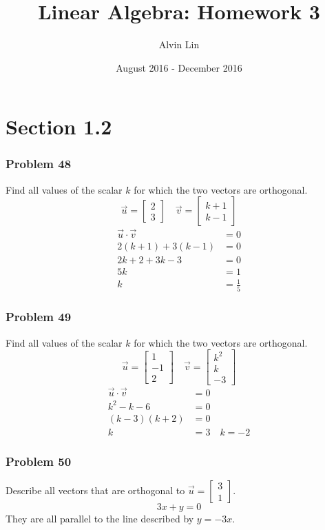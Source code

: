 \documentclass[letterpaper, 12pt]{math}
\title{Linear Algebra: Homework 3}
\author{Alvin Lin}
\date{August 2016 - December 2016}
\begin{document}
\maketitle

\section*{Section 1.2}

\subsubsection*{Problem 48}
Find all values of the scalar \( k \) for which the two vectors are orthogonal.
\[ \vec{u} = \begin{bmatrix}2 \\ 3\end{bmatrix} \quad
  \vec{v} = \begin{bmatrix}k+1 \\ k-1\end{bmatrix} \]
\begin{align*}
  \vec{u}\cdot\vec{v} &= 0 \\
  2(k+1)+3(k-1) &= 0 \\
  2k+2+3k-3 &= 0 \\
  5k &= 1 \\
  k &= \frac{1}{5}
\end{align*}

\subsubsection*{Problem 49}
Find all values of the scalar \( k \) for which the two vectors are orthogonal.
\[ \vec{u} = \begin{bmatrix}1 \\ -1 \\ 2\end{bmatrix} \quad
  \vec{v} = \begin{bmatrix}k^2 \\ k \\ -3\end{bmatrix} \]
\begin{align*}
  \vec{u}\cdot\vec{v} &= 0 \\
  k^2-k-6 &= 0 \\
  (k-3)(k+2) &= 0 \\
  k &= 3 \quad k = -2
\end{align*}

\subsubsection*{Problem 50}
Describe all vectors that are orthogonal to \( \vec{u} = \begin{bmatrix}3 \\ 1
\end{bmatrix} \).
\[ 3x+y = 0 \]
They are all parallel to the line described by \( y = -3x \).
\end{document}
